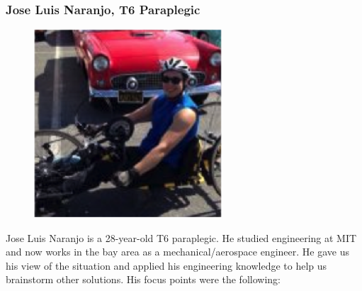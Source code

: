\subsubsection{Jose Luis Naranjo, T6 Paraplegic}
\begin{figure}[h]
  \centering
     \includegraphics[width=7cm]{images/image025}
  \label{fig:25}
\end{figure}

Jose Luis Naranjo is a 28-year-old T6 paraplegic.  He studied engineering at MIT and now works in the bay area as a mechanical/aerospace engineer.  He gave us his view of the situation and applied his engineering knowledge to help us brainstorm other solutions.  His focus points were the following:

